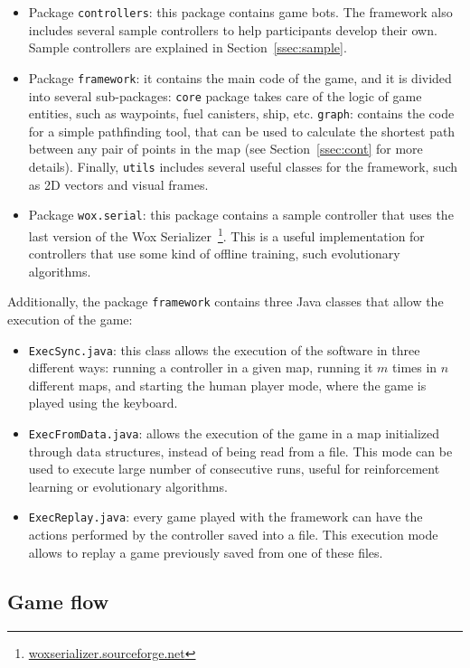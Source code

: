 \documentclass[conference]{IEEEtran}
\newcommand{\code}[1]{{\lstinline!#1!}}
\begin{document}
\begin{itemize}
\item Package \code{controllers}: this package contains game bots. The framework also includes several sample controllers to help participants develop their own. Sample controllers are explained in Section~\ref{ssec:sample}.
\item Package \code{framework}: it contains the main code of the game, and it is divided into several sub-packages: \code{core} package takes care of the logic of game entities, such as waypoints, fuel canisters, ship, etc. \code{graph}: contains the code for a simple pathfinding tool, that can be used to calculate the shortest path between any pair of points in the map (see Section~\ref{ssec:cont} for more details). Finally, \code{utils} includes several useful classes for the framework, such as 2D vectors and visual frames.
\item Package \code{wox.serial}: this package contains a sample controller that uses the last version of the Wox Serializer~\footnote{\url{woxserializer.sourceforge.net}}. This is a useful implementation for controllers that use some kind of offline training, such evolutionary algorithms.
\end{itemize}

Additionally, the package \code{framework} contains three Java classes that allow the execution of the game:

\begin{itemize}
\item \code{ExecSync.java}: this class allows the execution of the software in three different ways: running a controller in a given map, running it $m$ times in $n$ different maps, and starting the human player mode, where the game is played using the keyboard.
\item \code{ExecFromData.java}: allows the execution of the game in a map initialized through data structures, instead of being read from a file. This mode can be used to execute large number of consecutive runs, useful for reinforcement learning or evolutionary algorithms.
\item \code{ExecReplay.java}: every game played with the framework can have the actions performed by the controller saved into a file. This execution mode allows to replay a game previously saved from one of these files.
\end{itemize}

\subsection{Game flow}
\end{document}
